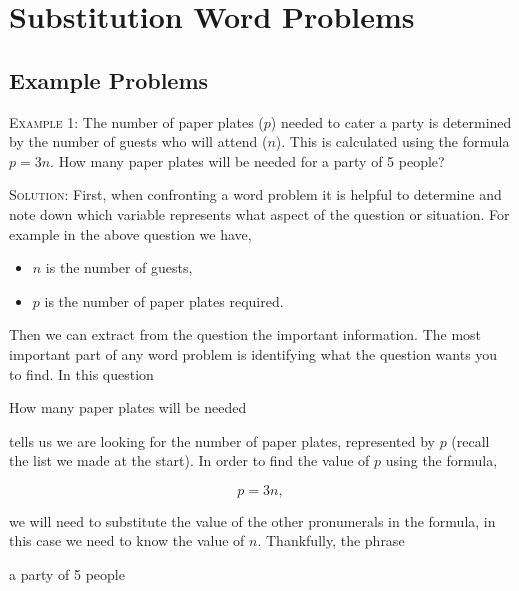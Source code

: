 \documentclass[a4paper,12pt]{article}
\begin{document}
\renewcommand{\labelenumii}{\alph{enumii})}

\large
\section*{Substitution Word Problems}

\subsection*{Example Problems}


\textsc{Example 1}: The number of paper plates ($p$) needed to cater a
party is determined by the number of guests who will attend ($n$). This
is calculated using the formula $p = 3n$. How many paper plates 
will be needed for a party of 5 people?

\textsc{Solution}: First, when confronting a word problem 
it is helpful to determine and note down which variable 
represents what aspect of the question or situation. 
For example in the above question we have,

\begin{itemize}
\item $n$ is the number of guests,
\item $p$ is the number of paper plates required.
\end{itemize}

Then we can extract from the question the important
information. The most important part of any word problem
is identifying what the question wants you to find. In this 
question

\begin{displayquote}
How many paper plates will be needed
\end{displayquote}

tells us we are looking for the number of paper plates, 
represented by $p$ (recall the list we made at the start).
In order to find the value of $p$ using the formula,

$$p = 3n,$$

we will need to substitute the value of the other pronumerals in 
the formula, in this case we need to know the value of $n$. 
Thankfully, the phrase

\begin{displayquote}
a party of 5 people
\end{displayquote}
\end{document}
